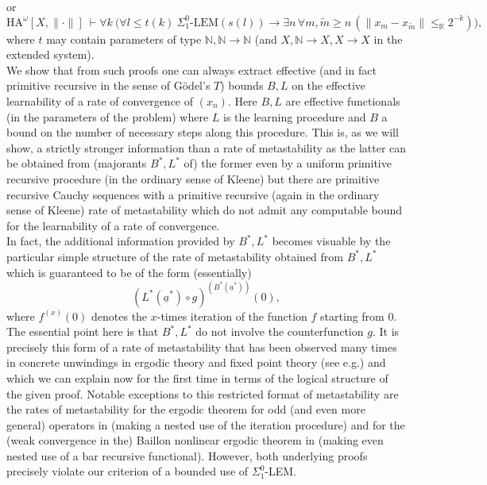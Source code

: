 \documentclass[1p]{elsarticle}
\newcommand{\RR}{\ensuremath{\mathbb{R}}}
\newcommand{\NN}{\ensuremath{\mathbb{N}}}
\theoremstyle{plain}
\theoremstyle{definition}
\theoremstyle{remark}
\theoremstyle{definition}
\begin{document}
or 
\[ \mbox{HA}^{\omega}[X,\|\cdot\|] \ \vdash \forall k \  \big( \forall l\le 
t(k) \ 
\Sigma^0_1\mbox{-LEM}(s(l))\to \exists n\,\forall m,\tilde{m}\ge n\,
(\|x_m-x_{\tilde{m}}\|\le_{\RR} 2^{-k})\big), \]
where $t$ may contain parameters of type $\NN, \NN\to\NN$ (and $X,\NN\to X, 
X\to X$ in the extended system). \\[2mm] 
We show that from such proofs one can always extract effective (and in 
fact primitive recursive in the sense of G\"odel's $T$) bounds $B,L$ on the 
effective learnability of a rate of convergence of $(x_n).$ Here 
$B,L$ are effective functionals (in the parameters of the problem) where 
$L$ is the learning procedure and $B$ a bound on the number of 
necessary steps along this procedure.  
This is, as we will show, a strictly stronger information than a 
rate of metastability as 
the latter can be obtained from (majorants $B^*,L^*$ of) the former 
even by a uniform primitive 
recursive procedure (in the ordinary sense of Kleene) but there are 
primitive recursive 
Cauchy sequences with a primitive recursive (again in the ordinary 
sense of Kleene) rate of metastability which 
do not admit any computable bound for the 
learnability of a rate of convergence. \\ In fact, the additional 
information provided by $B^*,L^*$ becomes visuable by the particular 
simple structure of the rate of metastability obtained from 
$B^*,L^*$ which is guaranteed 
to be of the form (essentially) 
\[ (L^*(\underline{a}^*)\circ g)^{(B^*(\underline{a}^*))}(0), \] 
where $f^{(x)}(0)$ denotes the $x$-times iteration of the function $f$ 
starting from $0.$ The essential point here is that $B^*,L^*$ do not 
involve the counterfunction $g.$ It is precisely this form of a rate 
of metastability that has been observed many times in concrete unwindings 
in ergodic theory and fixed point theory (see e.g.\cite{Avigad/Gerhardy/Towsner,Kohlenbach/Leustean4,Kohlenbach/Leustean3,Kohlenbach(Browder),Kohlenbach/Leustean6,Kohlenbach/Leustean7}) and which we can explain 
now for the first time in terms of the logical structure of the given proof. 
Notable exceptions to this restricted format of metastability are the rates 
of metastability for 
the ergodic theorem for odd (and even more general) operators in 
\cite{Safarik(11)} (making a nested use of the iteration procedure) and 
for the (weak convergence in the) Baillon nonlinear ergodic theorem 
in \cite{Kohlenbach(Baillon)} (making even nested use of a bar recursive 
functional). However, both underlying proofs precisely 
violate our criterion of a bounded use of $\Sigma^0_1$-LEM.  
\end{document}
